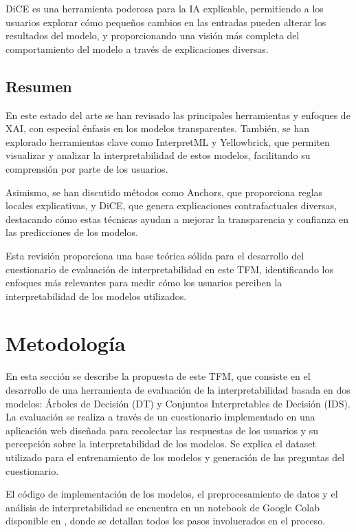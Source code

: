 DiCE es una herramienta poderosa para la IA explicable, permitiendo a los usuarios explorar cómo pequeños cambios en las entradas pueden alterar los resultados del modelo, y proporcionando una visión más completa del comportamiento del modelo a través de explicaciones diversas.

\section{Resumen}

En este estado del arte se han revisado las principales herramientas y enfoques de XAI, con especial énfasis en los modelos transparentes. También, se han explorado herramientas clave como InterpretML y Yellowbrick, que permiten visualizar y analizar la interpretabilidad de estos modelos, facilitando su comprensión por parte de los usuarios.

Asimismo, se han discutido métodos como Anchors, que proporciona reglas locales explicativas, y DiCE, que genera explicaciones contrafactuales diversas, destacando cómo estas técnicas ayudan a mejorar la transparencia y confianza en las predicciones de los modelos.

Esta revisión proporciona una base teórica sólida para el desarrollo del cuestionario de evaluación de interpretabilidad en este TFM, identificando los enfoques más relevantes para medir cómo los usuarios perciben la interpretabilidad de los modelos utilizados.

\chapter{Metodología}

En esta sección se describe la propuesta de este TFM, que consiste en el desarrollo de una herramienta de evaluación de la interpretabilidad basada en dos modelos: Árboles de Decisión (DT) y Conjuntos Interpretables de Decisión (IDS). La evaluación se realiza a través de un cuestionario implementado en una aplicación web diseñada para recolectar las respuestas de los usuarios y su percepción sobre la interpretabilidad de los modelos. Se explica el dataset utilizado para el entrenamiento de los modelos y generación de las preguntas del cuestionario. 

El código de implementación de los modelos, el preprocesamiento de datos y el análisis de interpretabilidad se encuentra en un notebook de Google Colab disponible en \cite{vargas2024interpretability}, donde se detallan todos los pasos involucrados en el proceso.

